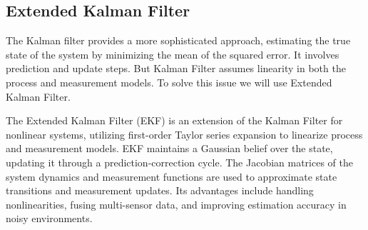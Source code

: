 
\subsection{Extended Kalman Filter}
The Kalman filter provides a more sophisticated approach, estimating the true state of the system by minimizing the mean of the squared error. It involves prediction and update steps. But Kalman Filter assumes linearity in both the process and measurement models. To solve this issue we will use Extended Kalman Filter.

The Extended Kalman Filter (EKF) is an extension of the Kalman Filter for nonlinear systems, utilizing first-order Taylor series expansion to linearize process and measurement models. EKF maintains a Gaussian belief over the state, updating it through a prediction-correction cycle. The Jacobian matrices of the system dynamics and measurement functions are used to approximate state transitions and measurement updates. Its advantages include handling nonlinearities, fusing multi-sensor data, and improving estimation accuracy in noisy environments. 

